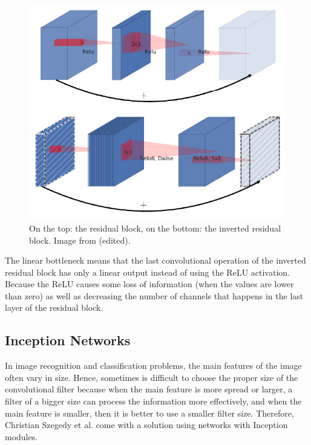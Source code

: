 \documentclass[thesis=B,english]{FITthesis}[2019/12/23]
\begin{document}
\begin{figure}[ht]
		\includegraphics[scale=0.5]{images/res_block_and_inv_res_block.jpeg}
		\centering
		\caption{On the top: the residual block, on the bottom: the inverted residual block. Image from \cite{DBLP:journals/corr/abs-1801-04381} (edited).}
		\label{fig:res_block}
\end{figure}

The linear bottleneck means that the last convolutional operation of the inverted residual block has only a linear output instead of using the ReLU activation. Because the ReLU causes some loss of information (when the values are lower than zero) as well as decreasing the number of channels that happens in the last layer of the residual block.\cite{DBLP:journals/corr/abs-1801-04381}

\subsection{Inception Networks}
In image recognition and classification problems, the main features of the image often vary in size. Hence, sometimes is difficult to choose the proper size of the convolutional filter because when the main feature is more spread or larger, a filter of a bigger size can process the information more effectively, and when the main feature is smaller, then it is better to use a smaller filter size. Therefore, Christian Szegedy et al. \cite{DBLP:journals/corr/SzegedyLJSRAEVR14} come with a solution using networks with Inception modules.
\end{document}
